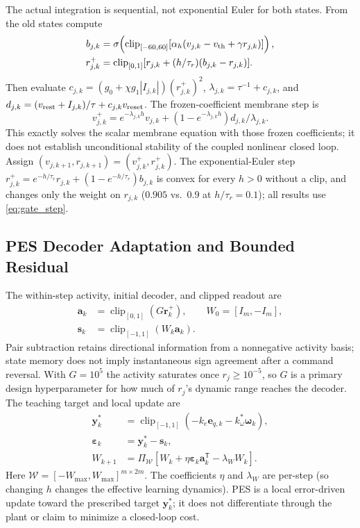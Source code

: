 \documentclass[letterpaper, 10 pt, conference]{ieeeconf}
\newcommand{\T}{^{\mathsf T}}
\newcommand{\clip}{\operatorname{clip}}
\begin{document}
The actual integration is sequential, not exponential Euler for both
states. From the old states compute
\begin{align}
 b_{j,k}&=\sigma\!\left(\clip_{[-60,60]}
       [\alpha_h(v_{j,k}-v_{\rm th}+\gamma r_{j,k})]\right),\\
 r_{j,k}^{+}&=\clip_{[0,1]}
       [r_{j,k}+(h/\tau_r)(b_{j,k}-r_{j,k})].
 \label{eq:gate_step}
\end{align}
Then evaluate $c_{j,k}=(g_0+\chi g_1|I_{j,k}|)(r_{j,k}^{+})^2$,
$\lambda_{j,k}=\tau^{-1}+c_{j,k}$, and
$d_{j,k}=(v_{\rm rest}+I_{j,k})/\tau+c_{j,k}v_{\rm reset}$. The
frozen-coefficient membrane step is
\begin{equation}
 v_{j,k}^{+}=e^{-\lambda_{j,k}h}v_{j,k}
       +(1-e^{-\lambda_{j,k}h})d_{j,k}/\lambda_{j,k}.
 \label{eq:mem_step}
\end{equation}
This exactly solves the scalar membrane equation with those frozen
coefficients; it does not establish unconditional stability of the coupled
nonlinear closed loop. Assign $(v_{j,k+1},r_{j,k+1})=(v_{j,k}^{+},r_{j,k}^{+})$.
The exponential-Euler step $r_{j,k}^{+}=e^{-h/\tau_r}r_{j,k}+(1-e^{-h/\tau_r})b_{j,k}$ is
convex for every $h>0$ without a clip, and changes only the weight on $r_{j,k}$
($0.905$ vs.\ $0.9$ at $h/\tau_r=0.1$); all results use \eqref{eq:gate_step}.



\subsection{PES Decoder Adaptation and Bounded Residual}

The within-step activity, initial decoder, and clipped readout are
\begin{equation}
 \begin{aligned}
 \bm a_k&=\clip_{[0,1]}(G\bm r_k^+),\qquad W_0=[I_m,-I_m],\\
 \bm s_k&=\clip_{[-1,1]}(W_k\bm a_k).
 \end{aligned}
 \label{eq:readout}
\end{equation}
Pair subtraction retains directional information from a nonnegative
activity basis; state memory does not imply instantaneous sign agreement
after a command reversal. With $G=10^5$ the activity saturates once
$r_j\ge10^{-5}$, so $G$ is a primary design hyperparameter for how much of
$r_j$'s dynamic range reaches the decoder. The teaching target and local update are
\begin{align}
 \bm y_k^*&=\clip_{[-1,1]}(-k_e\bm e_{q,k}-k_\omega^*\bm\omega_k),\\
 \bm\varepsilon_k&=\bm y_k^*-\bm s_k,\\
 W_{k+1}&=\Pi_{\mathcal W}
       [W_k+\eta\bm\varepsilon_k\bm a_k\T-\lambda_W W_k].
 \label{eq:pes}
\end{align}
Here $\mathcal W=[-W_{\max},W_{\max}]^{m\times2m}$. The coefficients $\eta$ and $\lambda_W$ are per-step (so changing $h$ changes the effective learning dynamics). PES is a local error-driven update toward the prescribed target $\bm y_k^*$; it does not differentiate through the plant or claim to minimize a closed-loop cost.
\end{document}
